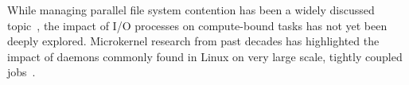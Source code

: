 While managing parallel file system contention has been a widely discussed topic~\cite{managing-contention}, the impact of I/O processes on compute-bound tasks has not yet been deeply explored. Microkernel research from past decades has highlighted the impact of daemons commonly found in Linux on very large scale, tightly coupled jobs~\cite{daemon-interference}. 
